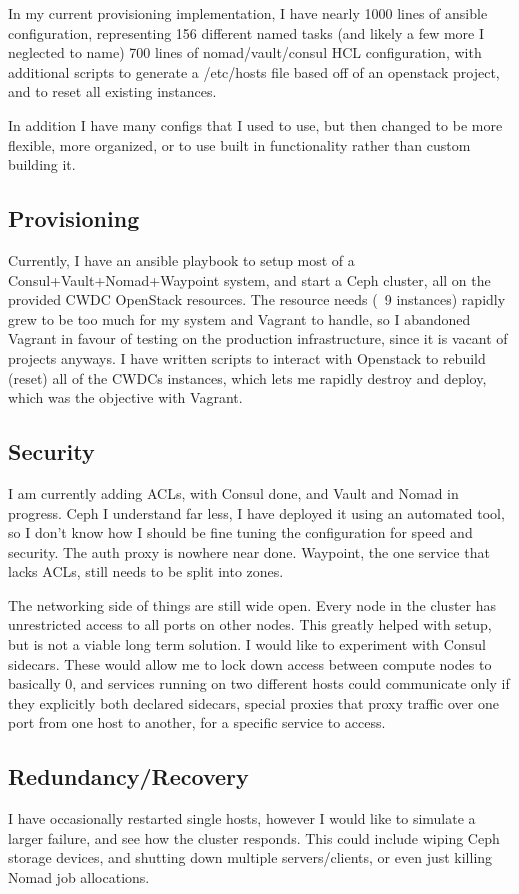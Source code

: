 \documentclass{article}
\begin{document}
In my current provisioning implementation, I have nearly 1000 lines of ansible configuration, representing 156 different named tasks (and likely a few more I neglected to name) 700 lines of nomad/vault/consul HCL configuration, with additional scripts to generate a /etc/hosts file based off of an openstack project, and to reset all existing instances.

In addition I have many configs that I used to use, but then changed to be more flexible, more organized, or to use built in functionality rather than custom building it.

\subsection{Provisioning}
Currently, I have an ansible playbook to setup most of a Consul+Vault+Nomad+Waypoint system, and start a Ceph cluster, all on the provided CWDC OpenStack resources. The resource needs (~9 instances) rapidly grew to be too much for my system and Vagrant to handle, so I abandoned Vagrant in favour of testing on the production infrastructure, since it is vacant of projects anyways. I have written scripts to interact with Openstack to rebuild (reset) all of the CWDCs instances, which lets me rapidly destroy and deploy, which was the objective with Vagrant.

\subsection{Security}
I am currently adding ACLs, with Consul done, and Vault and Nomad in progress. Ceph I understand far less, I have deployed it using an automated tool, so I don't know how I should be fine tuning the configuration for speed and security. The auth proxy is nowhere near done. Waypoint, the one service that lacks ACLs, still needs to be split into zones. 


The networking side of things are still wide open. Every node in the cluster has unrestricted access to all ports on other nodes. This greatly helped with setup, but is not a viable long term solution. I would like to experiment with Consul sidecars. These would allow me to lock down access between compute nodes to basically 0, and services running on two different hosts could communicate only if they explicitly both declared sidecars, special proxies that proxy traffic over one port from one host to another, for a specific service to access.
\subsection{Redundancy/Recovery}
I have occasionally restarted single hosts, however I would like to simulate a larger failure, and see how the cluster responds. This could include wiping Ceph storage devices, and shutting down multiple servers/clients, or even just killing Nomad job allocations.
\end{document}
